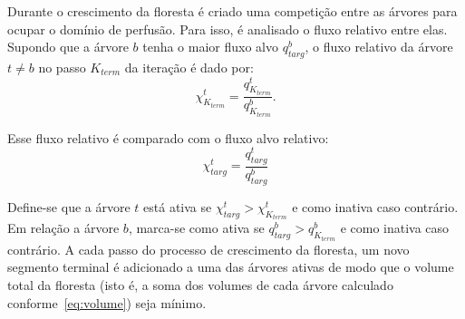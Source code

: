 Durante o crescimento da floresta é criado uma competição entre as 
árvores para ocupar o domínio de perfusão. Para isso, é analisado o fluxo relativo entre elas.
Supondo que a árvore $b$ tenha o maior fluxo
alvo $q_{targ}^b$, o fluxo relativo da árvore $t\neq b$ no passo $K_{term}$ da
iteração é dado por:
\begin{equation}
 \chi_{K_{term}}^t = \dfrac{q_{K_{term}}^t}{q_{K_{term}}^b}\textrm{.}
 \label{eq:fluxo.relativo.temporario}
\end{equation}

Esse fluxo relativo é comparado com o fluxo alvo relativo:
\begin{equation}
 \chi_{targ}^t = \dfrac{q_{targ}^t}{q_{targ}^b}
 \label{eq:fluxo.relativo.total}
\end{equation}

Define-se que a árvore $t$ está ativa se $\chi_{targ}^t > \chi_{K_{term}}^t$ e como
inativa caso contrário. Em relação a árvore $b$, marca-se como ativa se
$q_{targ}^b > q_{K_{term}}^b$ e como inativa caso contrário. A cada passo do processo de
crescimento da floresta, um novo segmento terminal é adicionado a uma das árvores ativas 
de modo que o volume total da floresta (isto é, a soma dos volumes de cada árvore calculado 
conforme~\eqref{eq:volume}) seja mínimo.


